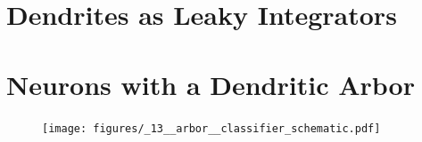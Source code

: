 \documentclass[twocolumn]{article}
\begin{document}

\section{\label{sec:dendrites}Dendrites as Leaky Integrators}
% 

 

\section{\label{sec:dendritic_arbor}Neurons with a Dendritic Arbor}

%

\begin{figure}[h!]
\texttt{[image: figures/\_13\_\_arbor\_\_classifier\_schematic.pdf]}
\end{figure}
\end{document}
